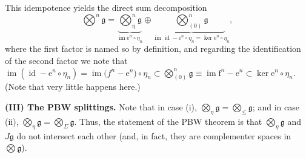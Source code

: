 \documentclass[11pt,a4paper]{amsart}
\DeclareMathOperator{\im}{im}
\DeclareMathOperator{\id}{id}
\newcommand{\botimes}{{\textstyle\bigotimes}}
\theoremstyle{definition}
\theoremstyle{plain}
\begin{document}
This idempotence yields the direct sum decomposition
\[\botimes^n\mathfrak g =\underbrace{\botimes^n_{\eta}\mathfrak g}_{\im \mathrm e^{n}\circ\eta_n }\oplus
\underbrace{\qquad\botimes^n_{(0)}\mathfrak g\qquad}_{\im \id -\mathrm e^{n}\circ\eta_n =\ker \mathrm e^{n}\circ\eta_n },\]
where the first factor is named so by definition, and regarding the identification of the second factor we note that
$\im (\id-\mathrm e^{n}\circ\eta_n)=\im \mathrm (f^n-\mathrm e^{n})\circ\eta_n\subset\botimes^n_{(0)}\mathfrak g\equiv\im \mathrm f^n-\mathrm e^{n}\subset \ker \mathrm e^{n}\circ\eta_n$.
(Note that very little happens here.)

\textbf{(III) The PBW splittings.}
Note that in case (i), $\botimes_{\eta}\mathfrak g=\botimes_\leq\mathfrak g$; and in case (ii), $\botimes_{\eta}\mathfrak g=\botimes_\Sigma \mathfrak g$.
Thus, the statement of the PBW theorem is that $\bigotimes_\eta\mathfrak g$ and $J\mathfrak g$
do not intersect each other (and, in fact, they are complementer spaces in $\bigotimes\mathfrak g$).

\end{document}
